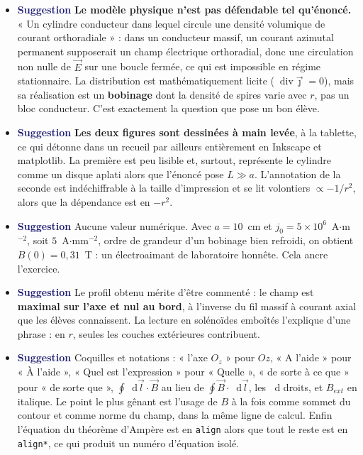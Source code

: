 \documentclass[a4paper,11pt]{article}
\newcommand*\dif{\mathop{}\!\mathrm{d}}
\newcommand*\diver{\mathop{}\!\mathrm{div}}
\newcommand{\suggestion}{\textcolor{MidnightBlue}{\textbf{Suggestion}}}
\begin{document}
\begin{itemize}
	\item \suggestion{} \textbf{Le modèle physique n'est pas défendable tel qu'énoncé.} « Un cylindre
	conducteur dans lequel circule une densité volumique de courant orthoradiale » : dans un
	conducteur massif, un courant azimutal permanent supposerait un champ électrique orthoradial, donc
	une circulation non nulle de $\vec E$ sur une boucle fermée, ce qui est impossible en régime
	stationnaire. La distribution est mathématiquement licite ($\diver\vec\jmath=0$), mais sa
	réalisation est un \textbf{bobinage} dont la densité de spires varie avec $r$, pas un bloc
	conducteur. C'est exactement la question que pose un bon élève.
	\item \suggestion{} \textbf{Les deux figures sont dessinées à main levée}, à la tablette, ce qui
	détonne dans un recueil par ailleurs entièrement en Inkscape et matplotlib. La première est peu
	lisible et, surtout, représente le cylindre comme un disque aplati alors que l'énoncé pose
	$L\gg a$. L'annotation de la seconde est indéchiffrable à la taille d'impression et se lit
	volontiers $\propto-1/r^2$, alors que la dépendance est en $-r^2$.
	\item \suggestion{} Aucune valeur numérique. Avec $a=10$~cm et $j_0=5\times10^{6}$~A$\cdot$m$^{-2}$,
	soit $5$~A$\cdot$mm$^{-2}$, ordre de grandeur d'un bobinage bien refroidi, on obtient
	$B(0)=0{,}31$~T : un électroaimant de laboratoire honnête. Cela ancre l'exercice.
	\item \suggestion{} Le profil obtenu mérite d'être commenté : le champ est \textbf{maximal sur
	l'axe et nul au bord}, à l'inverse du fil massif à courant axial que les élèves connaissent. La
	lecture en solénoïdes emboîtés l'explique d'une phrase : en $r$, seules les couches extérieures
	contribuent.
	\item \suggestion{} Coquilles et notations : « l'axe $O_z$ » pour $Oz$, « A l'aide » pour
	« À l'aide », « Quel est l'expression » pour « Quelle », « de sorte à ce que » pour « de sorte
	que », $\oint\dif\vec l\cdot\vec B$ au lieu de $\oint\vec B\cdot\dif\vec l$, les $\dif$ droits, et
	$B_{ext}$ en italique. Le point le plus gênant est l'usage de $B$ à la fois comme sommet du
	contour et comme norme du champ, dans la même ligne de calcul. Enfin l'équation du théorème
	d'Ampère est en \texttt{align} alors que tout le reste est en \texttt{align*}, ce qui produit un
	numéro d'équation isolé.
\end{itemize}
\end{document}
